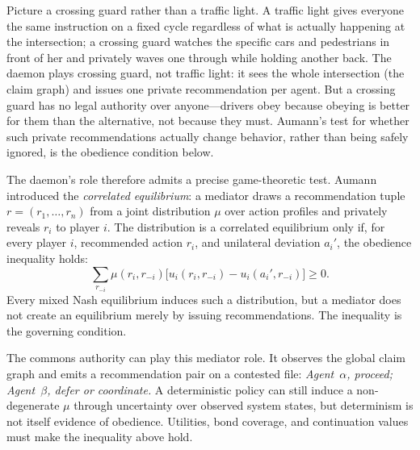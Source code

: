 \documentclass[11pt,a4paper]{article}
\theoremstyle{definition}
\theoremstyle{remark}
\begin{document}
Picture a crossing guard rather than a traffic light. A traffic light gives everyone the same instruction on a fixed cycle regardless of what is actually happening at the intersection; a crossing guard watches the specific cars and pedestrians in front of her and privately waves one through while holding another back. The daemon plays crossing guard, not traffic light: it sees the whole intersection (the claim graph) and issues one private recommendation per agent. But a crossing guard has no legal authority over anyone---drivers obey because obeying is better for them than the alternative, not because they must. Aumann's test for whether such private recommendations actually change behavior, rather than being safely ignored, is the obedience condition below.

The daemon's role therefore admits a precise game-theoretic test. Aumann~\cite{aumann1974subjectivity} introduced the \emph{correlated equilibrium}: a mediator draws a recommendation tuple $r=(r_1,\ldots,r_n)$ from a joint distribution $\mu$ over action profiles and privately reveals $r_i$ to player $i$. The distribution is a correlated equilibrium only if, for every player $i$, recommended action $r_i$, and unilateral deviation $a_i'$, the obedience inequality holds:
\[
\sum_{r_{-i}} \mu(r_i,r_{-i})
\bigl[u_i(r_i,r_{-i})-u_i(a_i',r_{-i})\bigr] \ge 0.
\]
Every mixed Nash equilibrium induces such a distribution, but a mediator does not create an equilibrium merely by issuing recommendations. The inequality is the governing condition.

The commons authority can play this mediator role. It observes the global claim graph and emits a recommendation pair on a contested file: \emph{Agent~$\alpha$, proceed; Agent~$\beta$, defer or coordinate.} A deterministic policy can still induce a non-degenerate $\mu$ through uncertainty over observed system states, but determinism is not itself evidence of obedience. Utilities, bond coverage, and continuation values must make the inequality above hold.
\end{document}
